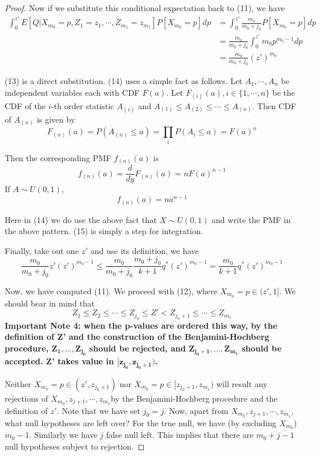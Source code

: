 \documentclass[12pt]{article}
\theoremstyle{plain}
\theoremstyle{definition}
\theoremstyle{remark}
\begin{document}
\begin{proof}
Now if we substitute this conditional expectation back to (11), we have
\begin{align}
    \int_0^{z'}E[Q|X_{m_0}=p,Z_1=z_1,\cdots,Z_{m_1}=z_{m_1}]P[X_{m_0}=p]dp 
    &=\int_0^{z'}\frac{m_0}{m_0+j_0}P[X_{m_0}=p]dp\\
    &=\frac{m_0}{m_0+j_0}\int_0^{z'}m_0p^{m_0-1}dp\\
    &=\frac{m_0}{m_0+j_0}(z')^{m_0}
\end{align}

(13) is a direct substitution. (14) uses a simple fact as follows. Let $A_1,\cdots,A_n$ be independent variables each with CDF $F(a)$. Let $F_{(i)}(a),i \in \{1,\cdots,n\}$ be the CDF of the $i$-th order statistic $A_{(i)}$ and $A_{(1)}\leq A_{(2)}\leq \cdots \leq A_{(n)}$. Then CDF of $A_{(n)}$ is given by \[
F_{(n)}(a)=P(A_{(n)}\leq a)=\prod_iP(A_i\leq a)=F(a)^n
\]

Then the corresponding PMF $f_{(n)}(a)$ is \[
f_{(n)}(a)=\frac{d}{dy}F_{(n)}(a)=nF(a)^{n-1}
\]
If $A\sim U(0,1)$,
\[ f_{(n)}(a)=na^{n-1}\]

Here in (14) we do use the above fact that $X\sim U(0,1)$ and write the PMF in the above pattern. (15) is simply a step for integration.

Finally, take out one $z'$ and use its definition, we have
\begin{equation}
 \frac{m_0}{m_0+j_0}z'(z')^{m_0-1}
\leq \frac{m_0}{m_0+j_0}\frac{m_0+j_0}{k+1}q^*(z')^{m_0-1}=\frac{m_0}{k+1}q^*(z')^{m_0-1}   
\end{equation}

Now, we have computed (11). We proceed with (12), where $X_{m_0}=p\in(z',1]$. We should bear in mind that \[
Z_1\leq Z_2 \leq \cdots \leq Z_{j_0} \leq Z' < Z_{j_0+1} \leq \cdots \leq Z_{m_1}
\]
\textbf{Important Note 4: when the p-values are ordered this way, by the definition of Z' and the construction of the Benjamini-Hochberg procedure, $\mathbf{Z_1,...,Z_{j_0}}$ should be rejected, and $\mathbf{Z_{j_0+1},...,Z_{m_1}}$ should be accepted. Z' takes value in $\mathbf{[z_{j_0},z_{j_0+1})}$. }

Neither $X_{m_0}=p\in(z',z_{j_0+1})$ nor $X_{m_0}=p\in[z_{j_0+1},z_{m_1})$ will result any rejections of $X_{m_0}, z_{j+1},\cdots,z_{m_1} $by the Benjamini-Hochberg procedure and the definition of $z'$. Note that we have set $j_0=j$. Now, apart from $X_{m_0}, z_{j+1},\cdots,z_{m_1}$, what null hypotheses are left over? For the true null, we have (by excluding $X_{m_0}$) $m_0-1$. Similarly we have $j$ false null left. This implies that there are $m_0+j-1$ null hypotheses subject to rejection.


\end{proof}
\end{document}
